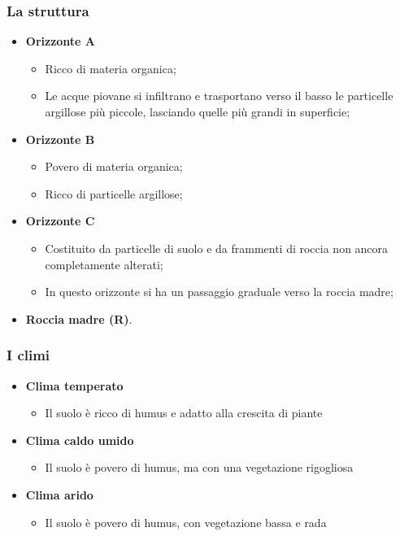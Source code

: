 \documentclass{article}
\begin{document}
\subsubsection{La struttura}
\begin{itemize}
    \item \textbf{Orizzonte A}
    \begin{itemize}
        \item Ricco di materia organica;
        \item Le acque piovane si infiltrano e trasportano verso il basso le particelle
            argillose più piccole, lasciando quelle più grandi in superficie;
    \end{itemize}
    \item \textbf{Orizzonte B}
    \begin{itemize}
        \item Povero di materia organica;
        \item Ricco di particelle argillose;
    \end{itemize}
    \item \textbf{Orizzonte C}
    \begin{itemize}
        \item Costituito da particelle di suolo e da frammenti di roccia non ancora
            completamente alterati;
        \item In questo orizzonte si ha un passaggio graduale verso la roccia madre;
    \end{itemize}
    \item \textbf{Roccia madre (R)}.
\end{itemize}

\subsubsection{I climi}
\begin{itemize}
    \item \textbf{Clima temperato}
    \begin{itemize}
        \item Il suolo è ricco di humus e adatto alla crescita di piante
    \end{itemize}
    \item \textbf{Clima caldo umido}
    \begin{itemize}
        \item Il suolo è povero di humus, ma con una vegetazione rigogliosa
    \end{itemize}
    \item \textbf{Clima arido}
    \begin{itemize}
        \item Il suolo è povero di humus, con vegetazione bassa e rada
    \end{itemize}
\end{itemize}
\phantom{}
\end{document}
